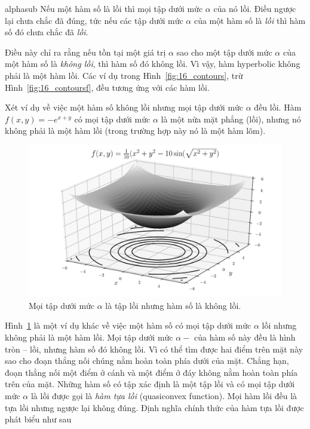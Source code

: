 \begin{mytheo}{}{alphasub}
Nếu một hàm số là lồi thì {mọi} tập dưới mức $\alpha$
của nó lồi. Điều ngược lại chưa chắc đã đúng, tức nếu các tập dưới mức $\alpha$ của một hàm số là \textit{lồi} thì hàm số đó chưa chắc đã \textit{lồi}. 
\end{mytheo}    

 
Điều này chỉ ra rằng nếu tồn tại một giá trị $\alpha$ sao cho một tập dưới mức 
$\alpha$ của một hàm số là \textit{không lồi}, thì hàm số đó {không lồi}. Vì vậy, hàm hyperbolic không phải là một hàm
lồi. Các ví dụ trong Hình~\ref{fig:16_contours}, trừ Hình~\ref{fig:16_contoursf},
đều tương ứng với các hàm lồi.
 
Xét ví dụ về việc một hàm số không lồi nhưng mọi
tập dưới mức $\alpha$ đều lồi. Hàm $f(x, y) = -e^{x+y}$ có mọi tập dưới mức 
$\alpha$ là một nửa mặt phẳng (lồi), nhưng nó
không phải là một hàm lồi (trong trường hợp này nó là một hàm lõm).
 
\begin{figure}[t]
\centering
    \includegraphics[width = .8\textwidth]{ebookML_src/src/convexity/sin_surf2_cropped.pdf}
    \caption[]{Mọi tập dưới mức $\alpha$ là tập lồi nhưng hàm số là không lồi.}
    \label{fig:16_ex}
\end{figure}

Hình~\ref{fig:16_ex} là một ví dụ khác về việc một hàm số có mọi tập dưới mức
$\alpha$ {lồi} nhưng không phải là một hàm lồi. Mọi tập dưới mức
$\alpha-$ của hàm số này đều là hình tròn  --  lồi, nhưng
hàm số đó không {lồi}. Vì có thể tìm được hai điểm trên mặt này
sao cho đoạn thẳng nối chúng nằm hoàn toàn phía dưới của mặt. Chẳng hạn,
đoạn thẳng nối một điểm ở
{cánh} và một điểm ở {đáy} không nằm hoàn toàn phía trên của mặt.
Những hàm số có tập xác định là một {tập lồi} và có mọi tập dưới mức $\alpha$
là lồi được gọi là  \textit{hàm tựa lồi} (quasiconvex function). Mọi hàm lồi đều là tựa lồi nhưng ngược lại không đúng. Định nghĩa chính thức của
hàm tựa lồi được phát biểu như sau

